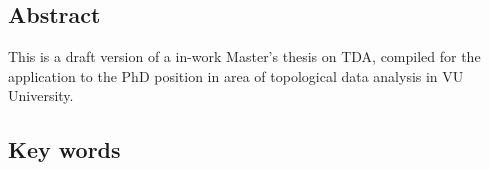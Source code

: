 \subsection*{Abstract}
This is a draft version of a in-work Master's thesis on TDA, compiled for the application to the PhD position in area of topological data analysis in VU University.


\subsection*{Key words}
